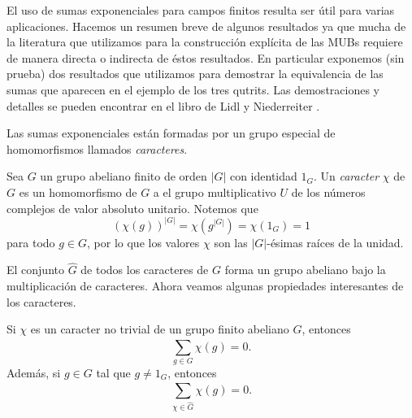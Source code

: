 El uso de sumas exponenciales para campos finitos resulta
ser útil para varias aplicaciones. Hacemos un resumen breve
de algunos resultados ya que mucha de la literatura que
utilizamos para la construcción explícita de las MUBs
requiere de manera directa o indirecta de éstos resultados.
En particular exponemos (sin prueba) dos resultados que
utilizamos para demostrar la equivalencia de las sumas que
aparecen en el ejemplo de los tres qutrits. Las
demostraciones y detalles se pueden encontrar en el libro de
Lidl y Niederreiter \cite{lidl1997}.

Las sumas exponenciales están formadas por un grupo especial
de homomorfismos llamados \textit{caracteres}.
\begin{definition}
  Sea $G$ un grupo abeliano finito de orden $|G|$ con
  identidad $1_G$. Un \textit{caracter} $\chi$ de $G$ es un
  homomorfismo de $G$ a el grupo multiplicativo $U$ de los
  números complejos de valor absoluto unitario. Notemos que
  \[
    \left( \chi(g) \right)^{|G|}
    = \chi\left( g^{|G|} \right) 
    = \chi\left( 1_G \right) 
    = 1
  \] 
  para todo $g \in G$, por lo que los valores $\chi$ son las
  $|G|$-ésimas raíces de la unidad. 
\end{definition}
El conjunto $\hat G$ de todos los caracteres de $G$ forma un
grupo abeliano bajo la multiplicación de caracteres. Ahora
veamos algunas propiedades interesantes de los caracteres.
\begin{theorem}
  \label{thm:lidl_char_sum}
  Si $\chi$ es un caracter no trivial de un grupo finito
  abeliano $G$, entonces
  \begin{equation}
    \sum_{g \in G}^{} \chi(g) = 0.
  \end{equation}
  Además, si $g \in G$ tal que $g \neq 1_G$, entonces
  \begin{equation}
    \sum_{\chi \in \hat G}^{} \chi(g) = 0.
  \end{equation}
\end{theorem}
